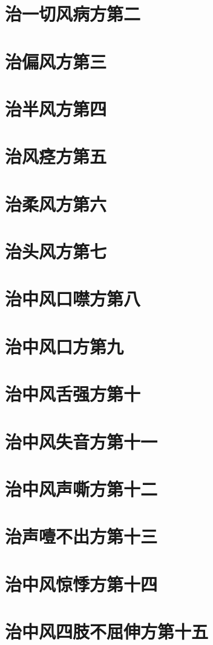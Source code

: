 \documentclass[a4paper,12pt,UTF8,twoside]{ctexbook}
\begin{document}
\chapter{治一切风病方第二}
\chapter{治偏风方第三}
\chapter{治半风方第四}
\chapter{治风痉方第五}
\chapter{治柔风方第六}
\chapter{治头风方第七}
\chapter{治中风口噤方第八}
\chapter{治中风口方第九}
\chapter{治中风舌强方第十}
\chapter{治中风失音方第十一}
\chapter{治中风声嘶方第十二}
\chapter{治声噎不出方第十三}
\chapter{治中风惊悸方第十四}
\chapter{治中风四肢不屈伸方第十五}
\end{document}

